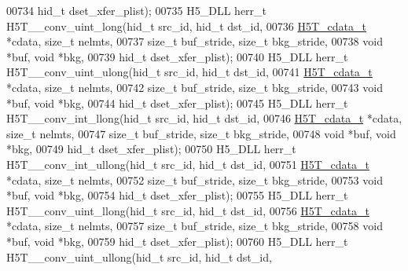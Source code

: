 \begin{DoxyCode}
00734                                   hid\_t dset\_xfer\_plist);
00735 H5\_DLL herr\_t H5T\_\_conv\_uint\_long(hid\_t src\_id, hid\_t dst\_id,
00736                   \hyperlink{struct_h5_t__cdata__t}{H5T\_cdata\_t} *cdata, \textcolor{keywordtype}{size\_t} nelmts,
00737                   \textcolor{keywordtype}{size\_t} buf\_stride, \textcolor{keywordtype}{size\_t} bkg\_stride,
00738                                   \textcolor{keywordtype}{void} *buf, \textcolor{keywordtype}{void} *bkg,
00739                                   hid\_t dset\_xfer\_plist);
00740 H5\_DLL herr\_t H5T\_\_conv\_uint\_ulong(hid\_t src\_id, hid\_t dst\_id,
00741                    \hyperlink{struct_h5_t__cdata__t}{H5T\_cdata\_t} *cdata, \textcolor{keywordtype}{size\_t} nelmts,
00742                    \textcolor{keywordtype}{size\_t} buf\_stride, \textcolor{keywordtype}{size\_t} bkg\_stride,
00743                                    \textcolor{keywordtype}{void} *buf, \textcolor{keywordtype}{void} *bkg,
00744                                    hid\_t dset\_xfer\_plist);
00745 H5\_DLL herr\_t H5T\_\_conv\_int\_llong(hid\_t src\_id, hid\_t dst\_id,
00746                   \hyperlink{struct_h5_t__cdata__t}{H5T\_cdata\_t} *cdata, \textcolor{keywordtype}{size\_t} nelmts,
00747                   \textcolor{keywordtype}{size\_t} buf\_stride, \textcolor{keywordtype}{size\_t} bkg\_stride,
00748                                   \textcolor{keywordtype}{void} *buf, \textcolor{keywordtype}{void} *bkg,
00749                                   hid\_t dset\_xfer\_plist);
00750 H5\_DLL herr\_t H5T\_\_conv\_int\_ullong(hid\_t src\_id, hid\_t dst\_id,
00751                    \hyperlink{struct_h5_t__cdata__t}{H5T\_cdata\_t} *cdata, \textcolor{keywordtype}{size\_t} nelmts,
00752                    \textcolor{keywordtype}{size\_t} buf\_stride, \textcolor{keywordtype}{size\_t} bkg\_stride,
00753                                    \textcolor{keywordtype}{void} *buf, \textcolor{keywordtype}{void} *bkg,
00754                                    hid\_t dset\_xfer\_plist);
00755 H5\_DLL herr\_t H5T\_\_conv\_uint\_llong(hid\_t src\_id, hid\_t dst\_id,
00756                    \hyperlink{struct_h5_t__cdata__t}{H5T\_cdata\_t} *cdata, \textcolor{keywordtype}{size\_t} nelmts,
00757                    \textcolor{keywordtype}{size\_t} buf\_stride, \textcolor{keywordtype}{size\_t} bkg\_stride,
00758                                    \textcolor{keywordtype}{void} *buf, \textcolor{keywordtype}{void} *bkg,
00759                                    hid\_t dset\_xfer\_plist);
00760 H5\_DLL herr\_t H5T\_\_conv\_uint\_ullong(hid\_t src\_id, hid\_t dst\_id,

\end{DoxyCode}
